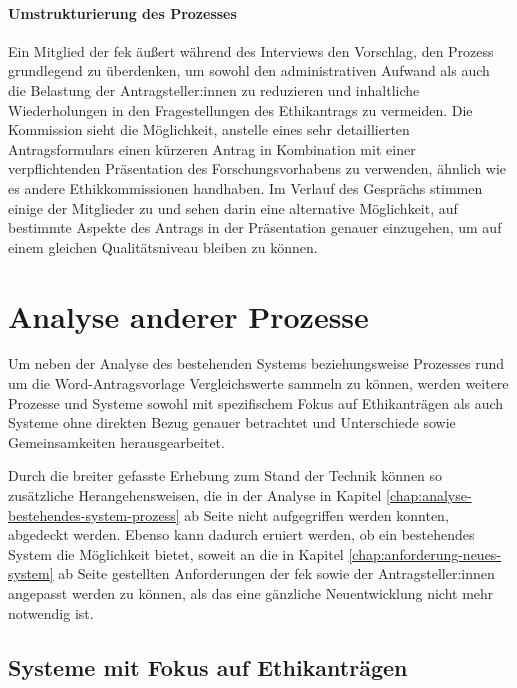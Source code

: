 \documentclass[a4paper,12pt,twoside,numbers=noendperiod]{scrreprt}
\begin{document}
\subsubsection*{Umstrukturierung des Prozesses}
\label{sub-sub-sec:umstrukturierung-prozess}

Ein Mitglied der \ac{fek} äußert während des Interviews den Vorschlag, den Prozess grundlegend zu überdenken, um sowohl den administrativen Aufwand als auch die Belastung der Antragsteller:innen zu reduzieren und inhaltliche Wiederholungen in den Fragestellungen des Ethikantrags zu vermeiden. Die Kommission sieht die Möglichkeit, anstelle eines sehr detaillierten Antragsformulars einen kürzeren Antrag in Kombination mit einer verpflichtenden Präsentation des Forschungsvorhabens zu verwenden, ähnlich wie es andere Ethikkommissionen handhaben. Im Verlauf des Gesprächs stimmen einige der Mitglieder zu und sehen darin eine alternative Möglichkeit, auf bestimmte Aspekte des Antrags in der Präsentation genauer einzugehen, um auf einem gleichen Qualitätsniveau bleiben zu können.

\cleardoublepage
\chapter{Analyse anderer Prozesse}
\label{chap:analyse-anderer-prozesse}

Um neben der Analyse des bestehenden Systems beziehungsweise Prozesses rund um die Word-Antragsvorlage Vergleichswerte sammeln zu können, werden weitere Prozesse und Systeme sowohl mit spezifischem Fokus auf Ethikanträgen als auch Systeme ohne direkten Bezug genauer betrachtet und Unterschiede sowie Gemeinsamkeiten herausgearbeitet.

Durch die breiter gefasste Erhebung zum Stand der Technik können so zusätzliche Herangehensweisen, die in der Analyse in Kapitel \ref{chap:analyse-bestehendes-system-prozess} ab Seite \pageref{chap:analyse-bestehendes-system-prozess} nicht aufgegriffen werden konnten, abgedeckt werden. Ebenso kann dadurch eruiert werden, ob ein bestehendes System die Möglichkeit bietet, soweit an die in Kapitel \ref{chap:anforderung-neues-system} ab Seite \pageref{chap:anforderung-neues-system} gestellten Anforderungen der \acl{fek} sowie der Antragsteller:innen angepasst werden zu können, als das eine gänzliche Neuentwicklung nicht mehr notwendig ist.

\section{Systeme mit Fokus auf Ethikanträgen}
\label{sec:systeme-mit-fokkus-ethikantrage}
\end{document}
